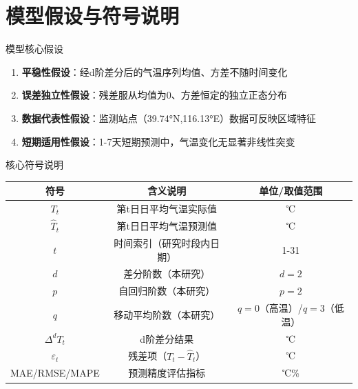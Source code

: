 \section{模型假设与符号说明}
\begin{frame}{模型核心假设}
    \begin{enumerate}
        \item \textbf{平稳性假设}：经d阶差分后的气温序列均值、方差不随时间变化
        \item \textbf{误差独立性假设}：残差服从均值为0、方差恒定的独立正态分布
        \item \textbf{数据代表性假设}：监测站点（39.74°N,116.13°E）数据可反映区域特征
        \item \textbf{短期适用性假设}：1-7天短期预测中，气温变化无显著非线性突变
    \end{enumerate}
\end{frame}

\begin{frame}{核心符号说明}
    \centering
    \begin{tabular}{|c|c|c|}
        \hline
        符号 & 含义说明 & 单位/取值范围 \\
        \hline
        $T_t$ & 第t日日平均气温实际值 & ℃ \\
        $\hat{T}_t$ & 第t日日平均气温预测值 & ℃ \\
        $t$ & 时间索引（研究时段内日期） & 1-31 \\
        $d$ & 差分阶数（本研究） & $d=2$ \\
        $p$ & 自回归阶数（本研究） & $p=2$ \\
        $q$ & 移动平均阶数（本研究） & $q=0$（高温）/$q=3$（低温） \\
        $\Delta^d T_t$ & d阶差分结果 & ℃ \\
        $\varepsilon_t$ & 残差项（$T_t - \hat{T}_t$） & ℃ \\
        MAE/RMSE/MAPE & 预测精度评估指标 & ℃\% \\
        \hline
    \end{tabular}
\end{frame}

